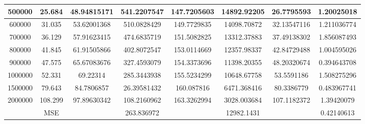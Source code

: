 \documentclass{article}
\begin{document}
\begin{flushleft}
\begin{adjustbox}{width=1.1\textwidth,center=\textwidth}
\begin{tabular}{|c|c|c|c|c|c|c|c|}
        500000&	25.684&	48.94815171&	541.2207547&147.7205603&	14892.92205&	26.7795593	&1.20025018\\\hline
        600000&	31.035&	53.62001368&	510.0828429&149.7729835	&14098.70872&	32.13547116	&1.211036774\\\hline
        700000&	36.129&	57.91623415&	474.6835719&151.5082825	&13312.37883&	37.49138302	&1.856087493\\\hline
        800000&	41.845&	61.91505866&	402.8072547&153.0114669	&12357.98337&	42.84729488	&1.004595026\\\hline
        900000&	47.575&	65.67083676&	327.4593079&154.3373696	&11398.20355&	48.20320674	&0.394643708\\\hline
        1000000&52.331&	69.22314&	285.3443938	&155.5234299	&10648.67758&	53.5591186	&1.508275296\\\hline
        1500000	&79.643&84.7806857&	26.39581432	&160.087816 	&6471.368416&	80.3386779	&0.483967741\\\hline
        2000000	&108.299&97.89630342&108.2160962&	163.3262994	&3028.003684&	107.1182372&	1.39420079\\

        \hline
        {}&	{MSE}&{}&		263.836972&{}&		12982.1431&{}&	0.42140613
\\
        \hline
        \end{tabular}
        \end{adjustbox}
    \end{flushleft}
    
\end{document}
